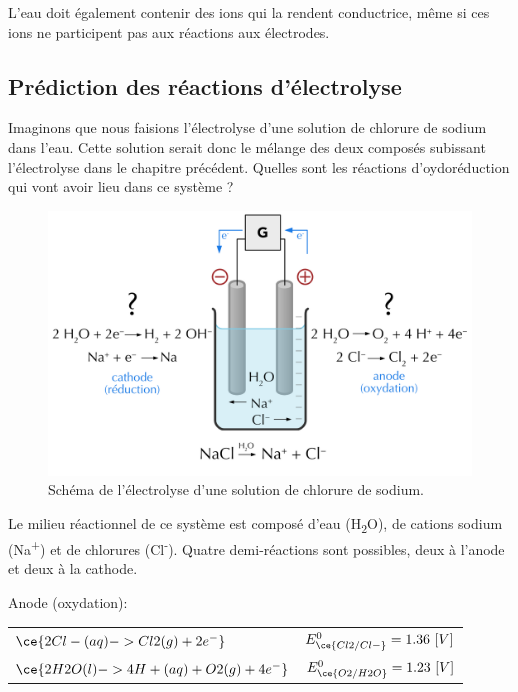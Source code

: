 \documentclass[
  11pt,
  a4paper,
  openany]{book}
\begin{document}
L'eau doit également contenir des ions qui la rendent conductrice, même si ces ions ne participent pas aux réactions aux électrodes.

\subsection{Prédiction des réactions d'électrolyse}\label{pruxe9diction-des-ruxe9actions-duxe9lectrolyse}

Imaginons que nous faisions l'électrolyse d'une solution de chlorure de sodium dans l'eau. Cette solution serait donc le mélange des deux composés subissant l'électrolyse dans le chapitre précédent. Quelles sont les réactions d'oydoréduction qui vont avoir lieu dans ce système ?

\begin{figure}

{\centering \includegraphics[width=0.65\linewidth]{images/electrolysis-NaCl-sol} 

}

\caption{Schéma de l'électrolyse d'une solution de chlorure de sodium.}\label{fig:electrolysis-water-NaCl-sol}
\end{figure}

Le milieu réactionnel de ce système est composé d'eau (H\textsubscript{2}O), de cations sodium (Na\textsuperscript{+}) et de chlorures (Cl\textsuperscript{-}). Quatre demi-réactions sont possibles, deux à l'anode et deux à la cathode.

Anode (oxydation):

\begin{longtable}[]{@{}
  >{\centering\arraybackslash}p{}
  >{\raggedright\arraybackslash}p{}@{}}
\toprule\noalign{}
\endhead
\bottomrule\noalign{}
\endlastfoot
\(\ce{2Cl-(aq) -> Cl2(g) + 2 e^-}\) & \(E^0_{\ce{Cl2/Cl-}} = 1.36\ [V]\) \\
\(\ce{2H2O(l) -> 4H+(aq) + O2(g) + 4 e^-}\) & \(E^0_{\ce{O2/H2O}} = 1.23\ [V]\) \\
\end{longtable}
\end{document}
